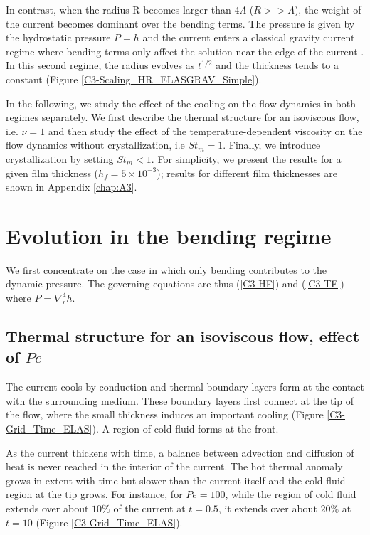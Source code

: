 In  contrast,  when  the  radius  R  becomes  larger  than  $4\Lambda$
($R>>\Lambda$), the  weight of the  current becomes dominant  over the
bending  terms.  The  pressure is  given by  the hydrostatic  pressure
$P =  h$ and  the current  enters a  classical gravity  current regime
where bending  terms only  affect the  solution near  the edge  of the
current  \citep{Huppert:1982a,Michaut:2011kg,Lister:2013ia}.  In  this
second regime, the radius evolves as $t^{1/2}$ and the thickness tends
to a constant (Figure \ref{C3-Scaling_HR_ELASGRAV_Simple}).

In  the following,  we study  the effect  of the  cooling on  the flow
dynamics in  both regimes  separately. We  first describe  the thermal
structure  for an  isoviscous flow,  i.e. $\nu=1$  and then  study the
effect  of the  temperature-dependent viscosity  on the  flow dynamics
without  crystallization,  i.e  $St_m   =1$.   Finally,  we  introduce
crystallization by  setting $St_m<1$.  For simplicity,  we present the
results for  a given  film thickness ($h_f=5\times  10^{-3}$); results
for different film thicknesses are shown in Appendix \ref{chap:A3}.

\section{Evolution in the bending regime}
\label{C3-sec:evol-bend-regime}

We first concentrate on the case  in which only bending contributes to
the dynamic pressure.  The  governing equations are thus (\ref{C3-HF})
and (\ref{C3-TF}) where $P=\nabla_r^4h$.

\subsection{Thermal structure for an isoviscous flow, effect of $Pe$}
\label{C3-sec:thermal-structure-an}

The current  cools by conduction  and thermal boundary layers  form at
the contact with the surrounding  medium.  These boundary layers first
connect at the  tip of the flow, where the  small thickness induces an
important cooling (Figure \ref{C3-Grid_Time_ELAS}).   A region of cold
fluid forms at the front.

As the  current thickens  with time, a  balance between  advection and
diffusion of heat is never reached in the interior of the current. The
hot thermal  anomaly grows  in extent  with time  but slower  than the
current  itself and  the  cold fluid  region at  the  tip grows.   For
instance, for $Pe  =100$, while the region of cold  fluid extends over
about $10\%$ of  the current at $t=0.5$, it extends  over about $20\%$
at $t =10$ (Figure \ref{C3-Grid_Time_ELAS}).  

